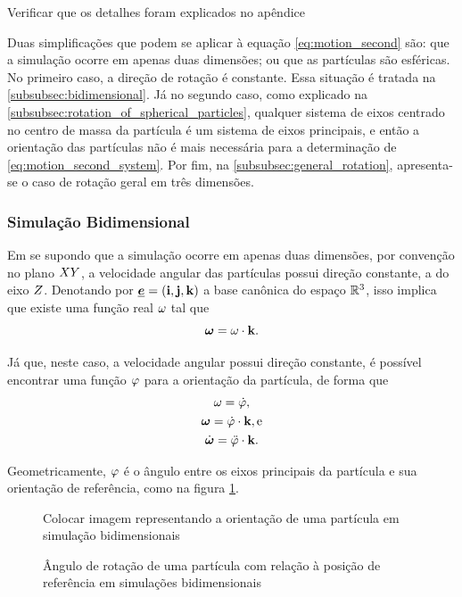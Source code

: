 \alert{Verificar que os detalhes foram explicados no apêndice}

Duas simplificações que podem se aplicar à equação \eqref{eq:motion_second} são: que a simulação ocorre em apenas duas dimensões; ou que as partículas são esféricas. No primeiro caso, a direção de rotação é constante. Essa situação é tratada na \autoref{subsubsec:bidimensional}. Já no segundo caso, como explicado na \autoref{subsubsec:rotation_of_spherical_particles}, qualquer sistema de eixos centrado no centro de massa da partícula é um sistema de eixos principais, e então a orientação das partículas não é mais necessária para a determinação de \eqref{eq:motion_second_system}. Por fim, na \autoref{subsubsec:general_rotation}, apresenta-se o caso de rotação geral em três dimensões.

\subsubsection{Simulação Bidimensional} \label{subsubsec:bidimensional}

Em se supondo que a simulação ocorre em apenas duas dimensões, por convenção no plano \(XY\), a velocidade angular das partículas possui direção constante, a do eixo \(Z\). Denotando por \(\basis = \pqty{\xUnit, \yUnit, \zUnit}\) a base canônica do espaço \(\mathbb{R}^3\), isso implica que existe uma função real \(\omega\) tal que
\[
	\bm{\omega} = \omega\cdot\mathbf{k}.
\]

Já que, neste caso, a velocidade angular possui direção constante, é possível encontrar uma função \(\varphi\) para a orientação da partícula, de forma que
\begin{gather*}
	\angularVelocityScalar = \deriv{1}{\orientationScalar}, \\
	\angularVelocity = \deriv{1}{\orientationScalar}\cdot\zUnit, \text{e} \\
	\angularAcceleration = \deriv{2}{\orientationScalar}\cdot\zUnit.
\end{gather*}

Geometricamente, \(\varphi\) é o ângulo entre os eixos principais da partícula e sua orientação de referência, como na figura \ref{fig:bidimensional_simulation}.

\begin{figure}[h]
	\caption{Ângulo de rotação de uma partícula com relação à posição de referência em simulações bidimensionais}
	\begin{center}
		\alert{Colocar imagem representando a orientação de uma partícula em simulação bidimensionais}
	\end{center}
	\label{fig:bidimensional_simulation}
\end{figure}

